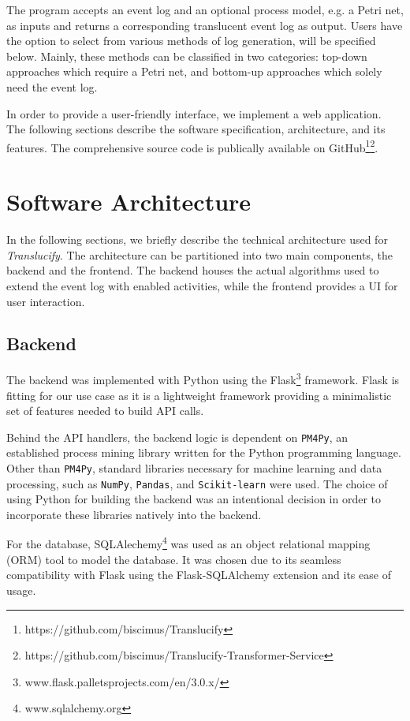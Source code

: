 

The program accepts an event log and an optional process model, e.g. a Petri net, as inputs and returns a corresponding translucent event log as output. Users have the option to select from various methods of log generation, will be specified below. Mainly, these methods can be classified in two categories: top-down approaches which require a Petri net, and bottom-up approaches which solely need the event log.

In order to provide a user-friendly interface, we implement a web application. The following sections describe the software specification, architecture, and its features. The comprehensive source code is publically available on GitHub\footnote{https://github.com/biscimus/Translucify}\footnote{https://github.com/biscimus/Translucify-Transformer-Service}.

\section{Software Architecture}

In the following sections, we briefly describe the technical architecture used for \emph{Translucify}. The architecture can be partitioned into two main components, the backend and the frontend. The backend houses the actual algorithms used to extend the event log with enabled activities, while the frontend provides a UI for user interaction.

\subsection{Backend}

The backend was implemented with Python using the Flask\footnote{www.flask.palletsprojects.com/en/3.0.x/} framework. Flask is fitting for our use case as it is a lightweight framework providing a minimalistic set of features needed to build API calls.

Behind the API handlers, the backend logic is dependent on \texttt{PM4Py}, an established process mining library written for the Python programming language. Other than \texttt{PM4Py}, standard libraries necessary for machine learning and data processing, such as \texttt{NumPy}, \texttt{Pandas}, and \texttt{Scikit-learn} were used. The choice of using Python for building the backend was an intentional decision in order to incorporate these libraries natively into the backend.

For the database, SQLAlechemy\footnote{www.sqlalchemy.org} was used as an object relational mapping (ORM) tool to model the database. It was chosen due to its seamless compatibility with Flask using the Flask-SQLAlchemy extension and its ease of usage.

